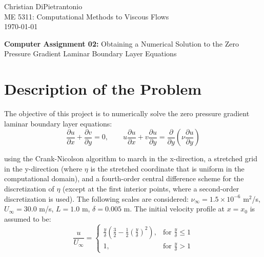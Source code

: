 \documentclass[letterpaper,12pt]{article}
\begin{document}


Christian DiPietrantonio \\
ME 5311: Computational Methods to Viscous Flows \\
\today

\vspace{6pt}


{\large \textbf{Computer Assignment 02:} \normalsize Obtaining a Numerical Solution to the Zero Pressure Gradient Laminar Boundary Layer Equations}


\section{Description of the Problem}

The objective of this project is to numerically solve the zero pressure gradient laminar boundary layer equations:
\begin{equation}
    \frac{\partial u}{\partial x} + \frac{\partial v}{\partial y} = 0, \qquad u \frac{\partial u}{\partial x} + v \frac{\partial u}{\partial y} = \frac{\partial}{\partial y} \left( \nu \frac{\partial u}{\partial y} \right)
\end{equation}

using the Crank-Nicolson algorithm to march in the x-direction, a stretched grid in the y-direction (where $\eta$ is the stretched coordinate that is uniform in the computational domain), and a fourth-order central difference scheme for the discretization of $\eta$ (except at the first interior points, where a second-order discretization is used). The following scales are considered: $\nu_\infty = 1.5 \times 10^{-6}$ m$^2$/s, $U_\infty = 30.0$ m/s, $L = 1.0$ m, $\delta = 0.005$ m. The initial velocity profile at $x = x_0$ is assumed to be:
\begin{equation}
    \frac{u}{U_\infty} = \begin{cases} \displaystyle \frac{y}{\delta} \left(\frac{3}{2} - \frac{1}{2} \left(\frac{y}{\delta} \right)^2 \right), & \text{for } \frac{y}{\delta} \leq 1 \\[4pt] 1, & \text{for } \frac{y}{\delta} > 1 \end{cases}
\end{equation}
\end{document}

